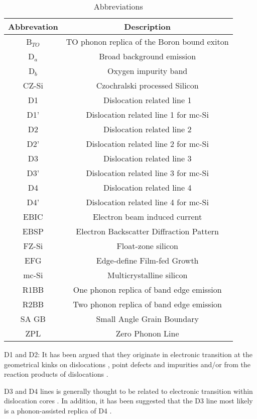 		
		
		\begin{table}
\centering
\begin{tabular}{|c|c|}
\hline

		Abbrevation & Description \\ \hline
		B$_{TO}$ & TO phonon replica of the Boron bound exiton \cite{sugimoto07} \\ \hline
		D$_a$ & Broad background emission \cite{tajima95} \\ \hline
		D$_b$ & Oxygen impurity band \cite{tajima95} \\ \hline
		CZ-Si & Czochralski processed Silicon \\ \hline
		D1	& Dislocation related line 1 \cite{drozdov76} \\ \hline
		D1' & Dislocation related line 1 for mc-Si \cite{tarasov00} \\ \hline
		D2	& Dislocation related line 2 \cite{drozdov76} \\ \hline
		D2' & Dislocation related line 2 for mc-Si \cite{tarasov00} \\ \hline
		D3	& Dislocation related line 3 \cite{drozdov76} \\ \hline
		D3' & Dislocation related line 3 for mc-Si \cite{tarasov00} \\ \hline
		D4	& Dislocation related line 4 \cite{drozdov76} \\ \hline
		D4' & Dislocation related line 4 for mc-Si \cite{tarasov00} \\ \hline
		EBIC & Electron beam induced current \cite{arguirov03} \\ \hline
		EBSP & Electron Backscatter Diffraction Pattern \cite{sugimoto07} \\ \hline
		FZ-Si & Float-zone silicon \\ \hline
		EFG & Edge-define Film-fed Growth \\ \hline
		mc-Si & Multicrystalline silicon \\ \hline
		R1BB & One phonon replica of band edge emission \cite{arguirov03} \\ \hline
		R2BB & Two phonon replica of band edge emission \cite{arguirov03} \\ \hline
		SA GB & Small Angle Grain Boundary \\ \hline
		ZPL & Zero Phonon Line \cite{calao88} \\ \hline

		\end{tabular}
\caption{Abbreviations}
\label{abbreviations}
\end{table}
		
		
	D1 and D2:	It has been argued that they originate in electronic transition at the geometrical kinks on dislocations \cite{suezawa83}, point defects \cite{sauer85} and impurities \cite{higgs91} and/or from the reaction products of dislocations \cite{sekiguchi95}.
	
	D3 and D4 lines is generally thought to be related to electronic transition within dislocation cores \cite{kveder95}. In addition, it has been suggested that the D3 line most likely is a phonon-assisted replica of D4 \cite{kveder95}.
